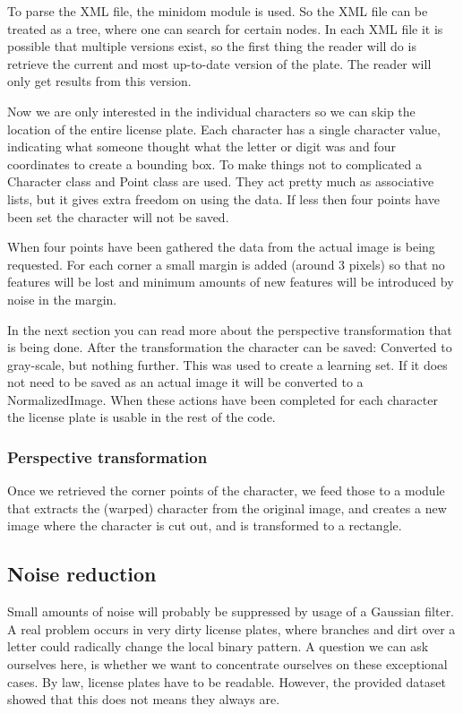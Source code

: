 \documentclass[a4paper]{article}
\begin{document}
To parse the XML file, the minidom module is used. So the XML file can be
treated as a tree, where one can search for certain nodes. In each XML file it
is possible that multiple versions exist, so the first thing the reader will do
is retrieve the current and most up-to-date version of the plate. The reader
will only get results from this version.

Now we are only interested in the individual characters so we can skip the
location of the entire license plate. Each character has a single character
value, indicating what someone thought what the letter or digit was and four
coordinates to create a bounding box. To make things not to complicated a
Character class and Point class are used. They act pretty much as associative
lists, but it gives extra freedom on using the data. If less then four points
have been set the character will not be saved.

When four points have been gathered the data from the actual image is being
requested. For each corner a small margin is added (around 3 pixels) so that no
features will be lost and minimum amounts of new features will be introduced by
noise in the margin.

In the next section you can read more about the perspective transformation that
is being done. After the transformation the character can be saved: Converted to
gray-scale, but nothing further. This was used to create a learning set. If it
does not need to be saved as an actual image it will be converted to a
NormalizedImage. When these actions have been completed for each character the
license plate is usable in the rest of the code.


\subsubsection{Perspective transformation}

Once we retrieved the corner points of the character, we feed those to a module
that extracts the (warped) character from the original image, and creates a new
image where the character is cut out, and is transformed to a rectangle.



\subsection{Noise reduction}

Small amounts of noise will probably be suppressed by usage of a Gaussian
filter. A real problem occurs in very dirty license plates, where branches and
dirt over a letter could radically change the local binary pattern. A question
we can ask ourselves here, is whether we want to concentrate ourselves on these
exceptional cases. By law, license plates have to be readable. However, the
provided dataset showed that this does not means they always are.
\end{document}
